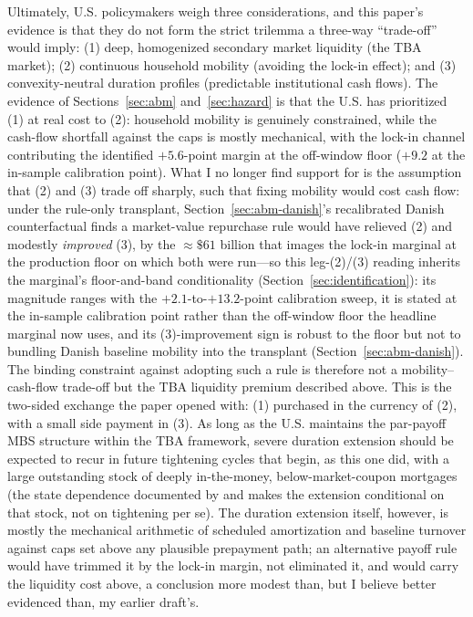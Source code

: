 \documentclass[12pt]{article}
\begin{document}
Ultimately, U.S. policymakers weigh three considerations, and this paper's evidence is that they do not form the strict trilemma a three-way ``trade-off'' would imply: (1) deep, homogenized secondary market liquidity (the TBA market); (2) continuous household mobility (avoiding the lock-in effect); and (3) convexity-neutral duration profiles (predictable institutional cash flows). The evidence of Sections~\ref{sec:abm} and~\ref{sec:hazard} is that the U.S. has prioritized (1) at real cost to (2): household mobility is genuinely constrained, while the cash-flow shortfall against the caps is mostly mechanical, with the lock-in channel contributing the identified $+5.6$-point margin at the off-window floor ($+9.2$ at the in-sample calibration point). What I no longer find support for is the assumption that (2) and (3) trade off sharply, such that fixing mobility would cost cash flow: under the rule-only transplant, Section~\ref{sec:abm-danish}'s recalibrated Danish counterfactual finds a market-value repurchase rule would have relieved (2) and modestly \emph{improved} (3), by the $\approx\$61$ billion that images the lock-in marginal at the production floor on which both were run---so this leg-(2)/(3) reading inherits the marginal's floor-and-band conditionality (Section~\ref{sec:identification}): its magnitude ranges with the $+2.1$-to-$+13.2$-point calibration sweep, it is stated at the in-sample calibration point rather than the off-window floor the headline marginal now uses, and its (3)-improvement sign is robust to the floor but not to bundling Danish baseline mobility into the transplant (Section~\ref{sec:abm-danish}). The binding constraint against adopting such a rule is therefore not a mobility--cash-flow trade-off but the TBA liquidity premium described above. This is the two-sided exchange the paper opened with: (1) purchased in the currency of (2), with a small side payment in (3). As long as the U.S. maintains the par-payoff MBS structure within the TBA framework, severe duration extension should be expected to recur in future tightening cycles that begin, as this one did, with a large outstanding stock of deeply in-the-money, below-market-coupon mortgages (the state dependence documented by \citet{berger2021} and \citet{eichenbaum2022} makes the extension conditional on that stock, not on tightening per se). The duration extension itself, however, is mostly the mechanical arithmetic of scheduled amortization and baseline turnover against caps set above any plausible prepayment path; an alternative payoff rule would have trimmed it by the lock-in margin, not eliminated it, and would carry the liquidity cost above, a conclusion more modest than, but I believe better evidenced than, my earlier draft's.
\end{document}
